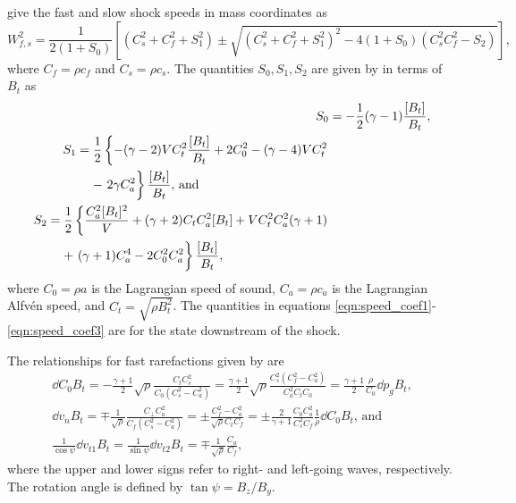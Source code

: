 \citet{Dai:1994a} give the fast and slow shock speeds in mass coordinates as
\begin{equation}
\label{eqn:speed_fs} W_{f,s}^2 = \frac{1}{2(1 + S_0)}\left[(C_s^2 + C_f^2 + S_1^2) \pm \sqrt{(C_s^2 + C_f^2 + S_1^2)^2 - 4(1 + S_0)(C_s^2C_f^2 - S_2)}\right],
\end{equation}
where $C_f = \rho c_f$ and $C_s = \rho c_s$.  The quantities $S_0, S_1, S_2$ are given by \citet{Ryu:1995a} in terms of $B_{t}$ as
\begin{align}
\label{eqn:speed_coef1} S_0 &= -\half (\gamma - 1)\frac{[B_{t}]}{B_{t}}, \\
\begin{split}
\label{eqn:speed_coef2} S_1 &= \half \left\{ -(\gamma - 2) V C_{t}^2 \frac{[B_{t}]}{B_{t}} + 2C_0^2 - (\gamma - 4) V C_{t}^2 \right. \\
& \;\;\;\; - \left. 2\gamma C_a^2 \vphantom{\frac{[B_{t}]}{B_{t}}} \right\} \frac{[B_{t}]}{B_{t}}\text{, and} 
\end{split} \\
\begin{split}
\label{eqn:speed_coef3} S_2 &= \half \left\{ \frac{C_a^2 [B_{t}]^2}{V} + (\gamma + 2)C_{t}C_a^2[B_{t}] + VC_{t}^2C_a^2(\gamma + 1) \right.\\
& \;\;\;\; + \left.(\gamma + 1)C_a^4  - 2C_0^2C_a^2 \vphantom{\frac{C_a^2 [B_{t}]^2}{V}}\right\} \frac{[B_{t}]}{B_{t}}, 
\end{split}
\end{align}
where $C_0 = \rho a$ is the Lagrangian speed of sound, $C_a = \rho c_a$ is the Lagrangian Alfv{\'e}n speed, and $C_{t} = \sqrt{\rho B_{t}^2}$.  The quantities in equations \eqref{eqn:speed_coef1}-\eqref{eqn:speed_coef3} are for the state downstream of the shock.

The relationships for fast rarefactions given by \citet{Ryu:1995a} are 
\begin{gather}
\label{eqn:rarefaction1} \dd{C_0}{B_{t}} = -\frac{\gamma + 1}{2} \sqrt{\rho} \frac{C_{t}C_s^2}{C_0(C_s^2 - C_a^2)} = \frac{\gamma + 1}{2} \sqrt{\rho} \frac{C_s^2(C_f^2 - C_a^2)}{C_a^2C_{t}C_0} = \frac{\gamma + 1}{2} \frac{\rho}{C_0} \dd{p_g}{B_{t}}, \\
\label{eqn:rarefaction2} \dd{v_n}{B_{t}} = \mp \frac{1}{\sqrt{\rho}} \frac{C_{\perp}C_a^2}{C_f(C_s^2 - C_a^2)} = \pm \frac{C_f^2 - C_a^2}{\sqrt{\rho} C_{t}C_f} = \pm\frac{2}{\gamma + 1} \frac{C_0C_a^2}{C_s^2C_f}\frac{1}{\rho} \dd{C_0}{B_{t}}\text{, and} \\
\label{eqn:rarefaction3} \frac{1}{\cos{\psi}} \dd{v_{t1}}{B_{t}} = \frac{1}{\sin{\psi}} \dd{v_{t2}}{B_{t}} = \mp \frac{1}{\sqrt{\rho}} \frac{C_a}{C_f},
\end{gather}
where the upper and lower signs refer to right- and left-going waves, respectively.  The rotation angle is defined by $\tan{\psi} = B_z/B_y$.

